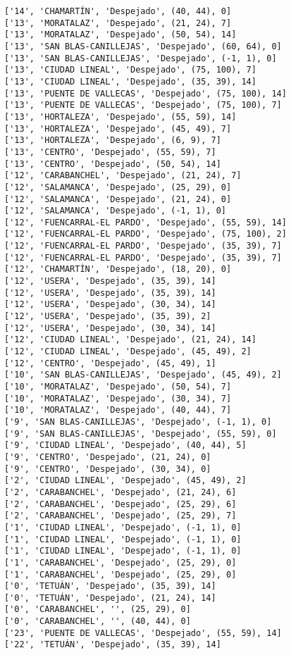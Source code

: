 \documentclass[11pt]{article}
\begin{document}
\begin{Verbatim}[commandchars=\\\{\}]
['14', 'CHAMARTÍN', 'Despejado', (40, 44), 0]
['13', 'MORATALAZ', 'Despejado', (21, 24), 7]
['13', 'MORATALAZ', 'Despejado', (50, 54), 14]
['13', 'SAN BLAS-CANILLEJAS', 'Despejado', (60, 64), 0]
['13', 'SAN BLAS-CANILLEJAS', 'Despejado', (-1, 1), 0]
['13', 'CIUDAD LINEAL', 'Despejado', (75, 100), 7]
['13', 'CIUDAD LINEAL', 'Despejado', (35, 39), 14]
['13', 'PUENTE DE VALLECAS', 'Despejado', (75, 100), 14]
['13', 'PUENTE DE VALLECAS', 'Despejado', (75, 100), 7]
['13', 'HORTALEZA', 'Despejado', (55, 59), 14]
['13', 'HORTALEZA', 'Despejado', (45, 49), 7]
['13', 'HORTALEZA', 'Despejado', (6, 9), 7]
['13', 'CENTRO', 'Despejado', (55, 59), 7]
['13', 'CENTRO', 'Despejado', (50, 54), 14]
['12', 'CARABANCHEL', 'Despejado', (21, 24), 7]
['12', 'SALAMANCA', 'Despejado', (25, 29), 0]
['12', 'SALAMANCA', 'Despejado', (21, 24), 0]
['12', 'SALAMANCA', 'Despejado', (-1, 1), 0]
['12', 'FUENCARRAL-EL PARDO', 'Despejado', (55, 59), 14]
['12', 'FUENCARRAL-EL PARDO', 'Despejado', (75, 100), 2]
['12', 'FUENCARRAL-EL PARDO', 'Despejado', (35, 39), 7]
['12', 'FUENCARRAL-EL PARDO', 'Despejado', (35, 39), 7]
['12', 'CHAMARTÍN', 'Despejado', (18, 20), 0]
['12', 'USERA', 'Despejado', (35, 39), 14]
['12', 'USERA', 'Despejado', (35, 39), 14]
['12', 'USERA', 'Despejado', (30, 34), 14]
['12', 'USERA', 'Despejado', (35, 39), 2]
['12', 'USERA', 'Despejado', (30, 34), 14]
['12', 'CIUDAD LINEAL', 'Despejado', (21, 24), 14]
['12', 'CIUDAD LINEAL', 'Despejado', (45, 49), 2]
['12', 'CENTRO', 'Despejado', (45, 49), 1]
['10', 'SAN BLAS-CANILLEJAS', 'Despejado', (45, 49), 2]
['10', 'MORATALAZ', 'Despejado', (50, 54), 7]
['10', 'MORATALAZ', 'Despejado', (30, 34), 7]
['10', 'MORATALAZ', 'Despejado', (40, 44), 7]
['9', 'SAN BLAS-CANILLEJAS', 'Despejado', (-1, 1), 0]
['9', 'SAN BLAS-CANILLEJAS', 'Despejado', (55, 59), 0]
['9', 'CIUDAD LINEAL', 'Despejado', (40, 44), 5]
['9', 'CENTRO', 'Despejado', (21, 24), 0]
['9', 'CENTRO', 'Despejado', (30, 34), 0]
['2', 'CIUDAD LINEAL', 'Despejado', (45, 49), 2]
['2', 'CARABANCHEL', 'Despejado', (21, 24), 6]
['2', 'CARABANCHEL', 'Despejado', (25, 29), 6]
['2', 'CARABANCHEL', 'Despejado', (25, 29), 7]
['1', 'CIUDAD LINEAL', 'Despejado', (-1, 1), 0]
['1', 'CIUDAD LINEAL', 'Despejado', (-1, 1), 0]
['1', 'CIUDAD LINEAL', 'Despejado', (-1, 1), 0]
['1', 'CARABANCHEL', 'Despejado', (25, 29), 0]
['1', 'CARABANCHEL', 'Despejado', (25, 29), 0]
['0', 'TETUÁN', 'Despejado', (35, 39), 14]
['0', 'TETUÁN', 'Despejado', (21, 24), 14]
['0', 'CARABANCHEL', '', (25, 29), 0]
['0', 'CARABANCHEL', '', (40, 44), 0]
['23', 'PUENTE DE VALLECAS', 'Despejado', (55, 59), 14]
['22', 'TETUÁN', 'Despejado', (35, 39), 14]

\end{Verbatim}
\end{document}
